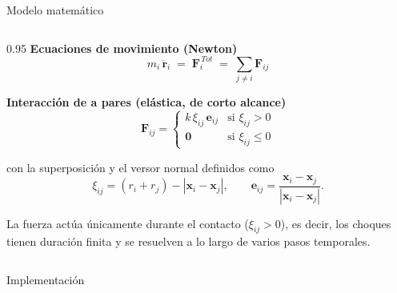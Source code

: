 \documentclass[10pt,aspectratio=169]{beamer}
\newcommand{\vect}[1]{\mathbf{#1}}
\newcommand{\sectiondivider}[1]{%
  \begin{frame}[plain,c]
    \centering
    {\usebeamercolor[fg]{structure}\fontsize{42}{50}\selectfont #1\par}
  \end{frame}%
}
\begin{document}
\begin{frame}{Modelo matemático}
    \begin{columns}[T]
        \begin{column}{0.95\textwidth}
            \textbf{Ecuaciones de movimiento (Newton)}
            \[
                m_i\,\ddot{\vect{r}}_i \;=\; \vect{F}_i^{\,Tot} \;=\; \sum_{j \neq i} \vect{F}_{ij}
            \]

            \vspace{0.4em}
            \textbf{Interacción de a pares (elástica, de corto alcance)}
            \[
                \vect{F}_{ij} =
                \begin{cases}
                    k\,\xi_{ij}\,\vect{e}_{ij} & \text{si } \xi_{ij} > 0 \\[2pt]
                    \vect{0} & \text{si } \xi_{ij} \leq 0
                \end{cases}
            \]

            \vspace{0.2em}
            con la superposición y el versor normal definidos como
            \[
                \xi_{ij} = (r_i + r_j) - |\vect{x}_i - \vect{x}_j|,
                \qquad
                \vect{e}_{ij} = \frac{\vect{x}_i - \vect{x}_j}{|\vect{x}_i - \vect{x}_j|}.
            \]

            \vspace{0.3em}
            \footnotesize
            La fuerza actúa únicamente durante el contacto ($\xi_{ij} > 0$),
            es decir, los choques tienen duración finita y se resuelven a lo largo
            de varios pasos temporales.
        \end{column}
    \end{columns}
\end{frame}

\sectiondivider{Implementación}
\end{document}
